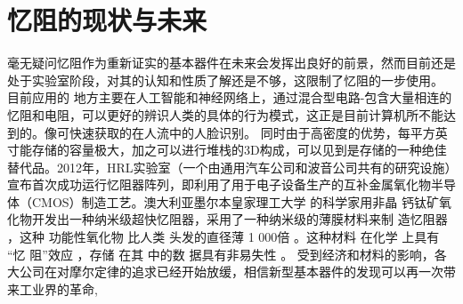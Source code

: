 \documentclass[UTF8]{article}
\begin{document}
\section{忆阻的现状与未来}
毫无疑问忆阻作为重新证实的基本器件在未来会发挥出良好的前景，然而目前还是处于实验室阶段，对其的认知和性质了解还是不够，这限制了忆阻的一步使用。
目前应用的 地方主要在人工智能和神经网络上\cite{mem2009}，通过混合型电路-包含大量相连的忆阻和电阻，可以更好的辨识人类的具体的行为模式，这正是目前计算机所不能达到的。像可快速获取的在人流中的人脸识别\cite{mem2}。
同时由于高密度的优势，每平方英寸能存储的容量极大，加之可以进行堆栈的3D构成，可以见到是存储的一种绝佳替代品\cite{mem2012}。2012年，HRL实验室（一个由通用汽车公司和波音公司共有的研究设施）宣布首次成功运行忆阻器阵列\cite{mem2010}，即利用了用于电子设备生产的互补金属氧化物半导体（CMOS）制造工艺。澳大利亚墨尔本皇家理工大学 的科学家用非晶 钙钛矿氧化物开发出一种纳米级超快忆阻器\cite{ou}，采用了一种纳米级的薄膜材料来制 造忆阻器 ，这种 功能性氧化物 比人类 头发的直径薄 1 000倍 。这种材料 在化学 上具有 “忆 阻”效应 ，存储 在其 中的数 据具有非易失性 。 受到经济和材料的影响，各大公司在对摩尔定律的追求已经开始放缓，相信新型基本器件的发现可以再一次带来工业界的革命\cite{moore1},




\end{document}
